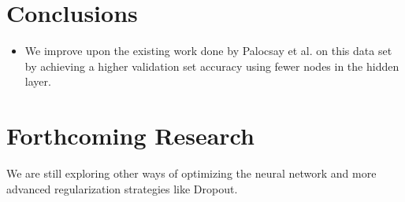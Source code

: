 \documentclass[a0,landscape]{a0poster}
\begin{document}
\begin{multicols}{4}
\color{SaddleBrown} %

\section*{Conclusions}

\begin{itemize}
\item We improve upon the existing work done by Palocsay et al. on this data set by achieving a higher validation set accuracy using fewer nodes in the hidden layer.
\end{itemize}

\color{DarkSlateGray} %


\section*{Forthcoming Research}

We are still exploring other ways of optimizing the neural network and more advanced regularization strategies like Dropout.


\nocite{*} %


\end{multicols}
\end{document}
